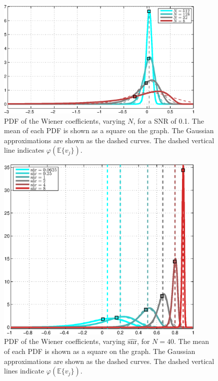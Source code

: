 \documentclass[a4paper,10pt]{article}
\begin{document}
\begin{figure}[htpb!]
	\centering
	\includegraphics[width=0.9\textwidth]{weight_pdf}
	\caption{PDF of the Wiener coefficients, varying $N$, for a SNR of 0.1. The mean of each PDF
	is shown as a square on the graph. The Gaussian approximations are shown as
	the dashed curves. The dashed vertical line indicates $\varphi(\mathbb E\{v_j\})$.}
	\label{fig:wiener_pdf_N}
\end{figure}

\begin{figure}[htpb!]
	\centering
	\includegraphics[width=0.9\textwidth]{weight_pdf-snr}
	\caption{PDF of the Wiener coefficients, varying $\hat{\text{snr}}$, for $N = 40$. The mean of each PDF
	is shown as a square on the graph. The Gaussian approximations are shown as
	the dashed curves. The dashed vertical lines indicate $\varphi(\mathbb E\{v_j\})$.}
	\label{fig:wiener_pdf_N}
\end{figure}
\end{document}

